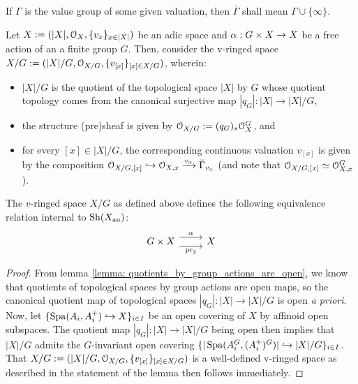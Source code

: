             \begin{convention}
                If $\Gamma$ is the value group of some given valuation, then $\bar{\Gamma}$ shall mean $\Gamma \cup \{\infty\}$.
            \end{convention}
            \begin{lemma} \label{lemma: free_actions_of_finite_groups_induce_equivalence_relations_on_adic_spaces}
                Let $X := (|X|, \mathcal{O}_X, \{v_x\}_{x \in |X|})$ be an adic space and $\alpha: G \x X \to X$ be a free action of an a finite group $G$. Then, consider the v-ringed space $X/G := (|X|/G, \mathcal{O}_{X/G}, \{v_{[x]}\}_{[x] \in X/G})$, wherein:
                    \begin{itemize}
                        \item $|X|/G$ is the quotient of the topological space $|X|$ by $G$ whose quotient topology comes from the canonical surjective map $|q_G|: |X| \to |X|/G$, 
                        \item the structure (pre)sheaf is given by $\mathcal{O}_{X/G} := (q_G)_*\mathcal{O}_X^G$, and
                        \item for every $[x] \in |X|/G$, the corresponding continuous valuation $v_{[x]}$ is given by the composition $\mathcal{O}_{X/G, [x]} \hookrightarrow \mathcal{O}_{X, x} \xrightarrow[]{v_x} \bar{\Gamma}_{v_x}$ (and note that $\mathcal{O}_{X/G, [x]} \simeq \mathcal{O}_{X, x}^G$).
                    \end{itemize}
                The $v$-ringed space $X/G$ as defined above defines the following equivalence relation internal to $\mathrm{Sh}(X_{\mathrm{an}})$:
                    $$
                        \begin{tikzcd}
                        	{G \x X} & X
                        	\arrow["{\pr_2}"', shift right=2, from=1-1, to=1-2]
                        	\arrow["\alpha", shift left=2, from=1-1, to=1-2]
                        \end{tikzcd}
                    $$
            \end{lemma}
                \begin{proof}
                    From lemma \ref{lemma: quotients_by_group_actions_are_open}, we know that quotients of topological spaces by group actions are open maps, so the canonical quotient map of topological spaces $|q_G|: |X| \to |X|/G$ is open \textit{a priori}. Now, let $\{\operatorname{Spa}(A_i, A_i^+) \hookrightarrow X\}_{i \in I}$ be an open covering of $X$ by affinoid open subspaces. The quotient map $|q_G|: |X| \to |X|/G$ being open then implies that $|X|/G$ admits the $G$-invariant open covering $\{|\operatorname{Spa}(A_i^G, (A_i^+)^G)| \hookrightarrow |X|/G\}_{i \in I}$. That $X/G := (|X|/G, \mathcal{O}_{X/G}, \{v_{[x]}\}_{[x] \in X/G})$ is a well-defined v-ringed space as described in the statement of the lemma then follows immediately. 
                \end{proof}
